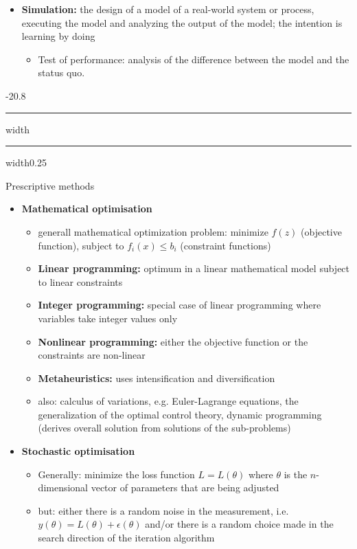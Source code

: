 \documentclass[a4paper, landscape, 6pt, fleqn]{scrartcl}
\makeatletter
\renewcommand{\emph}[1]{\textbf{#1}}
\renewcommand{\subsection}{\@startsection{subsection}{1}{0mm}%
{-2\baselineskip}{0.8\baselineskip}%
{\hrule depth 0.2pt width\columnwidth\hrule depth0.75pt
width0.25\columnwidth\vspace*{1.2em}\large\bfseries}}
\makeatother
\begin{document}
\begin{multicols*}{4}
\begin{itemize}
\begin{itemize}
\end{itemize}
\item \emph{Simulation:} the design of a model of a real-world system or process, executing the model and analyzing the output of the model; the intention is learning by doing
\begin{itemize}
\item Test of performance: analysis of the difference between the model and the status quo.
\end{itemize}
\end{itemize}

\subsection{Prescriptive methods}

\begin{itemize}
\item \emph{Mathematical optimisation}
\begin{itemize}
\item generall mathematical optimization problem: minimize $f(z)$ (objective function), subject to $f_i(x) \leq b_i$ (constraint functions)
\item \emph{Linear programming:} optimum in a linear mathematical model subject to linear constraints
\item \emph{Integer programming:} special case of linear programming where variables take integer values only
\item \emph{Nonlinear programming:} either the objective function or the constraints are non-linear
\item \emph{Metaheuristics:} uses intensification and diversification
\item also: calculus of variations, e.g. Euler-Lagrange equations, the generalization of the optimal control theory, dynamic programming (derives overall solution from solutions of the sub-problems)
\end{itemize}
\item \emph{Stochastic optimisation}
\begin{itemize}
\item Generally: minimize the loss function $L = L(\theta)$ where $\theta$ is the $n$-dimensional vector of parameters that are being adjusted
\item but: either there is a random noise in the measurement, i.e. $y(\theta) = L(\theta) + \epsilon(\theta)$ and/or there is a random choice made in the search direction of the iteration algorithm

\end{itemize}
\end{itemize}
\end{multicols*}
\end{document}
